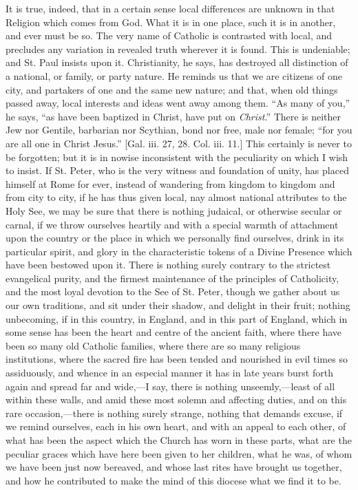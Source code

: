 It is true, indeed, that in a certain sense local
differences are unknown in that Religion which comes from
God. What it is in one place, such it is in another, and
ever must be so. The very name of Catholic is contrasted
with local, and precludes any variation in revealed truth
wherever it is found. This is undeniable; and St. Paul
insists upon it. Christianity, he says, has destroyed all
distinction of a national, or family, or party nature. He
reminds us that we are citizens of one city, and
partakers of one and the same new nature; and that, when
old things passed away, local interests and ideas went
away among them. ``As many of you,'' he says,
``as have been baptized in Christ, have put on \emph{Christ}.''
There is neither Jew nor Gentile, barbarian nor Scythian,
bond nor free, male nor female; ``for you are all one
in Christ Jesus.'' [Gal. iii. 27, 28. Col. iii. 11.]
This certainly is never to be forgotten; but it is in
nowise inconsistent with the peculiarity on which I wish
to insist. If St. Peter, who is the very witness and
foundation of unity, has placed himself at Rome for ever,
instead of wandering from kingdom to kingdom and from
city to city, if he has thus given local, nay almost
national attributes to the Holy See, we may be sure that
there is nothing judaical, or otherwise secular or
carnal, if we throw ourselves heartily and with a special
warmth of attachment upon the country or the place in
which we personally find ourselves, drink in its
particular spirit, and glory in the characteristic tokens
of a Divine Presence which have been bestowed upon it.
There is nothing surely contrary to the strictest
evangelical purity, and the firmest maintenance of the
principles of Catholicity, and the most loyal devotion to
the See of St. Peter, though we gather about us our own
traditions, and sit under their shadow, and delight in
their fruit; nothing unbecoming, if in this country, in
England, and in this part of England, which in some sense
has been the heart and centre of the ancient faith, where
there have been so many old Catholic families, where
there are so many religious institutions, where the
sacred fire has been tended and nourished in evil times
so assiduously, and whence in an especial manner it has
in late years burst forth again and spread far and
wide,—I say, there is nothing unseemly,—least
of all within these walls, and amid these most solemn and
affecting duties, and on this rare occasion,—there
is nothing surely strange, nothing that demands excuse,
if we remind ourselves, each in his own heart, and with
an appeal to each other, of what has been the aspect
which the Church has worn in these parts, what are the
peculiar graces which have here been given to her
children, what he was, of whom we have been just now
bereaved, and whose last rites have brought us together,
and how he contributed to make the mind of this diocese
what we find it to be.

